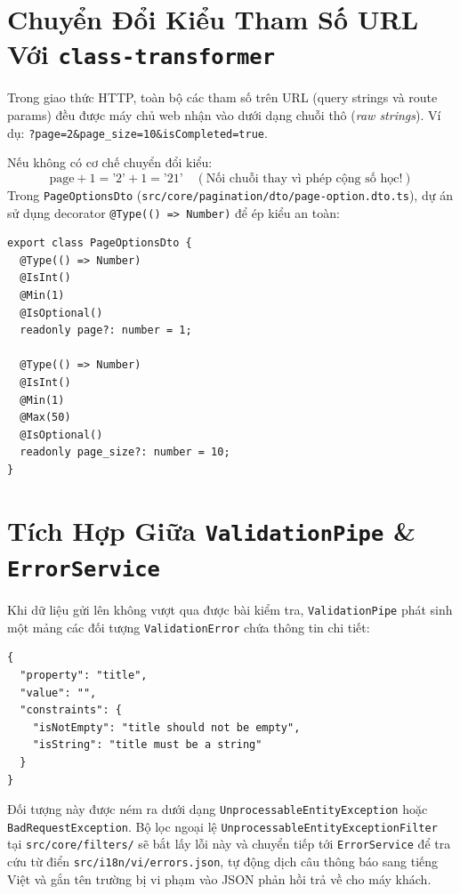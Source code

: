 \documentclass[12pt,a4paper,oneside]{book}
\begin{document}
\section{Chuyển Đổi Kiểu Tham Số URL Với \texttt{class-transformer}}
Trong giao thức HTTP, toàn bộ các tham số trên URL (query strings và route params) đều được máy chủ web nhận vào dưới dạng chuỗi thô (\textit{raw strings}). Ví dụ: \texttt{?page=2\&page\_size=10\&isCompleted=true}.

Nếu không có cơ chế chuyển đổi kiểu:
\begin{equation}
  \text{page} + 1 = \text{'2'} + 1 = \text{'21'} \quad (\text{Nối chuỗi thay vì phép cộng số học!})
\end{equation}
Trong \texttt{PageOptionsDto} (\texttt{src/core/pagination/dto/page-option.dto.ts}), dự án sử dụng decorator \texttt{@Type(() => Number)} để ép kiểu an toàn:
\begin{codebox}
\begin{Verbatim}[fontsize=\small]
export class PageOptionsDto {
  @Type(() => Number)
  @IsInt()
  @Min(1)
  @IsOptional()
  readonly page?: number = 1;

  @Type(() => Number)
  @IsInt()
  @Min(1)
  @Max(50)
  @IsOptional()
  readonly page_size?: number = 10;
}
\end{Verbatim}
\end{codebox}

\section{Tích Hợp Giữa \texttt{ValidationPipe} \& \texttt{ErrorService}}
Khi dữ liệu gửi lên không vượt qua được bài kiểm tra, \texttt{ValidationPipe} phát sinh một mảng các đối tượng \texttt{ValidationError} chứa thông tin chi tiết:
\begin{codebox}
\begin{Verbatim}[fontsize=\small]
{
  "property": "title",
  "value": "",
  "constraints": {
    "isNotEmpty": "title should not be empty",
    "isString": "title must be a string"
  }
}
\end{Verbatim}
\end{codebox}
Đối tượng này được ném ra dưới dạng \texttt{UnprocessableEntityException} hoặc \texttt{BadRequestException}. Bộ lọc ngoại lệ \texttt{UnprocessableEntityExceptionFilter} tại \texttt{src/core/filters/} sẽ bắt lấy lỗi này và chuyển tiếp tới \texttt{ErrorService} để tra cứu từ điển \texttt{src/i18n/vi/errors.json}, tự động dịch câu thông báo sang tiếng Việt và gắn tên trường bị vi phạm vào JSON phản hồi trả về cho máy khách.
\end{document}
